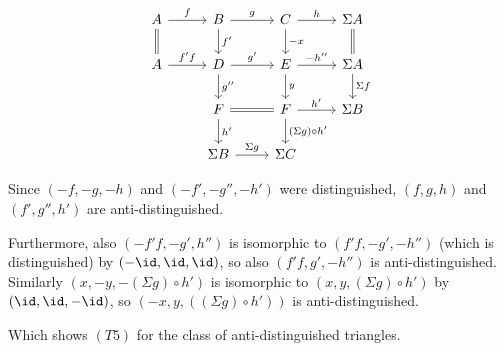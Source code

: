 \begin{exercise}[3]
\begin{enumerate}
\[ \begin{tikzcd}
A \ar[r, "f"] \ar[d, equal] &
B \ar[r, "g"] \ar[d, "f'"] &
C \ar[r, "h"] \ar[d, "-x"] &
\Sigma A      \ar[d, equal]
\\
A \ar[r, "f'f"]              &
D \ar[r, "g'"]  \ar[d, "g''"] &
E \ar[r, "-h''"] \ar[d, "y"]  &
\Sigma A        \ar[d, "\Sigma f"]
\\
&
F \ar[r, equal] \ar[d, "h'"] &
F \ar[r, "h'"] \ar[d, "(\Sigma g)\circ h'"]  &
\Sigma B
\\
&
\Sigma B \ar[r, "\Sigma g"] &
\Sigma C &
\end{tikzcd} \]

Since $(-f,-g,-h)$ and $(-f',-g'',-h')$ were distinguished, $(f,g,h)$ and
$(f',g'',h')$ are anti-distinguished. 

Furthermore, also $(-f'f, -g', h'')$ is isomorphic to $(f'f,-g', -h'')$
(which is distinguished) by $(-\id, \id, \id)$, so also $(f'f, g', -h'')$ is anti-distinguished.
Similarly $(x,-y,-(\Sigma g)\circ h')$ is isomorphic to $(x,y,(\Sigma g)\circ
h')$ by $(\id,\id,-\id)$, so $(-x,y,((\Sigma g)\circ h'))$ is
anti-distinguished.

Which shows $(T5)$ for the class of anti-distinguished triangles.
\end{enumerate}

\end{exercise}




